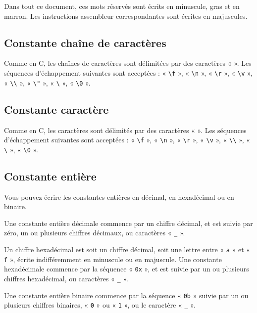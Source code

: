 Dans tout ce document, ces mots réservés sont écrits en minuscule, gras et en marron. Les instructions assembleur correspondantes sont écrites en majuscules.


\subsection{Constante chaîne de caractères}

Comme en C, les chaînes de caractères sont délimitées par des caractères « \texttt{\textquotedbl} ».  Les séquences d’échappement suivantes sont acceptées : « \texttt{\textbackslash f} », « \texttt{\textbackslash n} », « \texttt{\textbackslash r} », « \texttt{\textbackslash v} », « \texttt{\textbackslash\textbackslash} », « \texttt{\textbackslash"} », « \texttt{\textbackslash\textquotesingle} », « \texttt{\textbackslash 0} ».

\subsection{Constante caractère}

Comme en C, les caractères sont délimités par des caractères « \texttt{\textquotesingle} ».  Les séquences d’échappement suivantes sont acceptées : « \texttt{\textbackslash f} », « \texttt{\textbackslash n} », « \texttt{\textbackslash r} », « \texttt{\textbackslash v} », « \texttt{\textbackslash\textbackslash} », « \texttt{\textbackslash\textquotesingle} », « \texttt{\textbackslash 0} ».

\subsection{Constante entière}

Vous pouvez écrire les constantes entières en décimal, en hexadécimal ou en binaire. 

Une constante entière décimale commence par un chiffre décimal, et est suivie par zéro, un ou plusieurs chiffres décimaux, ou caractères « \texttt{\_} ».

Un chiffre hexadécimal est soit un chiffre décimal, soit une lettre entre « \texttt{a} » et « \texttt{f} », écrite indifféremment en minuscule ou en majuscule. Une constante hexadécimale commence par la séquence « \texttt{0x} », et est suivie par un ou plusieurs chiffres hexadécimal, ou caractères « \texttt{\_} ».

Une constante entière binaire commence par la séquence « \texttt{0b} » suivie par un ou plusieurs chiffres binaires, « \texttt{0} » ou « \texttt{1} », ou le caractère « \texttt{\_} ».

